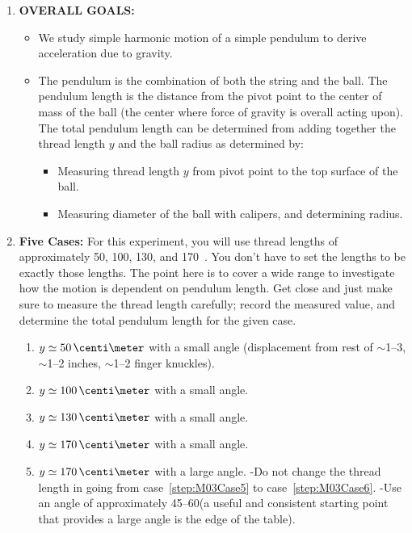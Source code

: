 \begin{enumerate}
\item \textbf{OVERALL GOALS:}
\begin{itemize}
    \item We study simple harmonic motion of a simple pendulum to derive acceleration due to gravity.
    \item The pendulum is the combination of both the string and the ball. The pendulum length is the distance from the pivot point to the center of mass of the ball (the center where force of gravity is overall acting upon). The total pendulum length can be determined from adding together the thread length $y$ and the ball radius as determined by:
\begin{itemize}
    \item Measuring thread length $y$ from pivot point to the top surface of the ball.
    \item Measuring diameter of the ball with calipers, and determining radius.
\end{itemize}
\end{itemize}


\item \textbf{Five Cases:} For this experiment, you will use thread lengths of approximately 50, 100, 130, and 170~\centi\meter. You don't have to set the lengths to be exactly those lengths. The point here is to cover a wide range to investigate how the motion is dependent on pendulum length. Get close and just make sure to measure the thread length carefully; record the measured value, and determine the total pendulum length for the given case. 
\begin{enumerate}
\item\label{step:M03Case1} $y\simeq  50\,\centi\meter$ with a small angle (displacement from rest of $\sim$1--3\degree, $\sim$1--2 inches, $\sim$1--2 finger knuckles).
\item\label{step:M03Case3} $y\simeq 100\,\centi\meter$ with a small angle.
\item\label{step:M03Case4} $y\simeq 130\,\centi\meter$ with a small angle.
\item\label{step:M03Case5} $y\simeq 170\,\centi\meter$ with a small angle.
\item\label{step:M03Case6} $y\simeq 170\,\centi\meter$ with a large angle.
  \subitem -Do not change the thread length in going from case~\ref{step:M03Case5} to case~\ref{step:M03Case6}.
  \subitem -Use an angle of approximately 45\degree--60\degree (a useful and consistent starting point that provides a large angle is the edge of the table).
\end{enumerate}


\end{enumerate}
